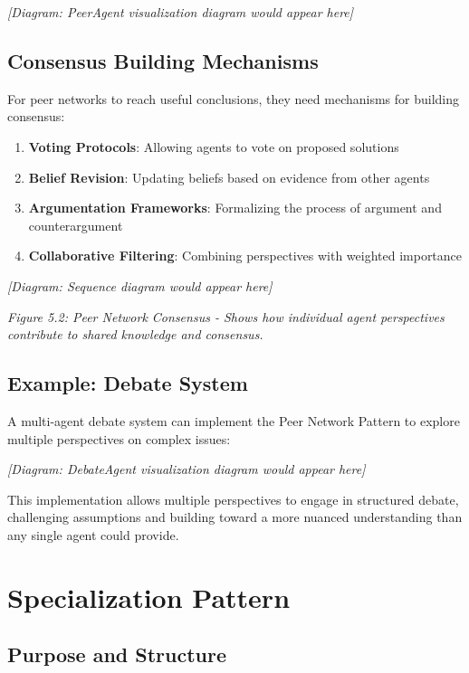 \documentclass[11pt,oneside]{book}
\providecommand{\tightlist}{%
  \setlength{\itemsep}{0pt}\setlength{\parskip}{0pt}}
\begin{document}
\emph{{[}Diagram: PeerAgent visualization diagram would appear here{]}}

\subsection{Consensus Building
Mechanisms}\label{consensus-building-mechanisms}

For peer networks to reach useful conclusions, they need mechanisms for
building consensus:

\begin{enumerate}
\def\labelenumi{\arabic{enumi}.}
\tightlist
\item
  \textbf{Voting Protocols}: Allowing agents to vote on proposed
  solutions
\item
  \textbf{Belief Revision}: Updating beliefs based on evidence from
  other agents
\item
  \textbf{Argumentation Frameworks}: Formalizing the process of argument
  and counterargument
\item
  \textbf{Collaborative Filtering}: Combining perspectives with weighted
  importance
\end{enumerate}

\emph{{[}Diagram: Sequence diagram would appear here{]}}

\emph{Figure 5.2: Peer Network Consensus - Shows how individual agent
perspectives contribute to shared knowledge and consensus.}

\subsection{Example: Debate System}\label{example-debate-system}

A multi-agent debate system can implement the Peer Network Pattern to
explore multiple perspectives on complex issues:

\emph{{[}Diagram: DebateAgent visualization diagram would appear
here{]}}

This implementation allows multiple perspectives to engage in structured
debate, challenging assumptions and building toward a more nuanced
understanding than any single agent could provide.

\section{Specialization Pattern}\label{specialization-pattern}

\subsection{Purpose and Structure}\label{purpose-and-structure-4}
\end{document}
